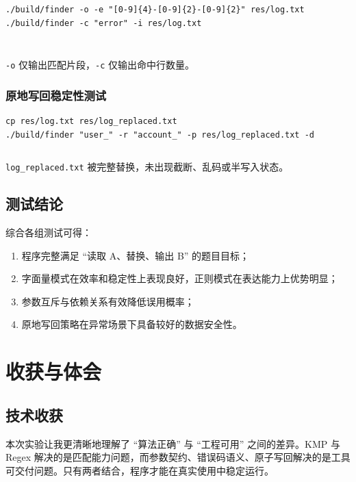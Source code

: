 \documentclass[12pt, a4paper]{ctexart}
\begin{document}
\begin{verbatim}
./build/finder -o -e "[0-9]{4}-[0-9]{2}-[0-9]{2}" res/log.txt
./build/finder -c "error" -i res/log.txt
\end{verbatim}

\inputminted{text}{../res/log_date.txt}

\inputminted{text}{../res/log_count.txt}

\texttt{-o} 仅输出匹配片段，\texttt{-c} 仅输出命中行数量。

\subsubsection{原地写回稳定性测试}

\begin{verbatim}
cp res/log.txt res/log_replaced.txt
./build/finder "user_" -r "account_" -p res/log_replaced.txt -d
\end{verbatim}

\inputminted{text}{../res/log_replaced.txt}

\texttt{log_replaced.txt} 被完整替换，未出现截断、乱码或半写入状态。

\subsection{测试结论}

综合各组测试可得：
\begin{enumerate}
    \item 程序完整满足 ``读取 A、替换、输出 B'' 的题目目标；
    \item 字面量模式在效率和稳定性上表现良好，正则模式在表达能力上优势明显；
    \item 参数互斥与依赖关系有效降低误用概率；
    \item 原地写回策略在异常场景下具备较好的数据安全性。
\end{enumerate}

\section{收获与体会}

\subsection{技术收获}

本次实验让我更清晰地理解了 ``算法正确'' 与 ``工程可用'' 之间的差异。KMP 与 Regex 解决的是匹配能力问题，而参数契约、错误码语义、原子写回解决的是工具可交付问题。只有两者结合，程序才能在真实使用中稳定运行。
\end{document}
